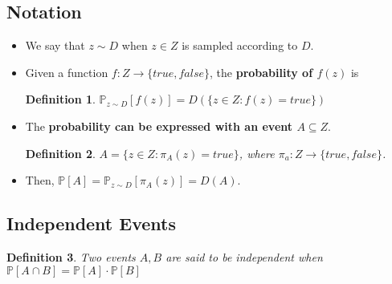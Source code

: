 \documentclass[12pt, a4paper, english]{report}
\newtheorem{definition}{Definition}
\begin{document}
\subsection{Notation}
\begin{itemize}
    \item We say that $z \sim D$ when $z \in Z$ is sampled according to $D$.
    \item Given a function $f: Z \rightarrow \{true, false\}$, the \textbf{probability of $f(z)$} is \\
    \begin{definition}
        $\mathbb{P}_{z \sim D}[f(z)] = D(\{z \in Z: f(z) = true\})$
    \end{definition}
    \item The \textbf{probability can be expressed with an event $A \subseteq Z$}. \\
    \begin{definition}
        $A = \{z \in Z: \pi_{A}(z) = true\}$, where $\pi_{a}: Z \rightarrow \{true, false\}$.\\
    \end{definition}
    \item Then, $\mathbb{P}[A] = \mathbb{P}_{z \sim D}[\pi_{A}(z)] = D(A)$.
\end{itemize}

\subsection{Independent Events}
\begin{definition}
    Two events $A, B$ are said to be independent when\\$\mathbb{P}[A \cap B] = \mathbb{P}[A] \cdot \mathbb{P}[B]$
\end{definition}
\end{document}
